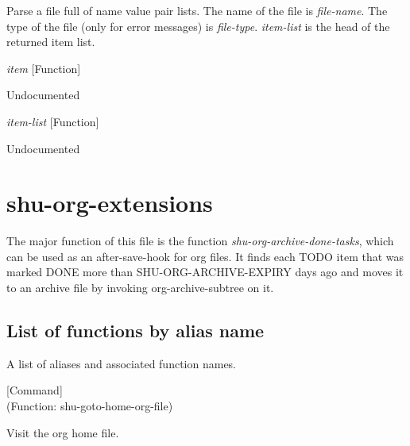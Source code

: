 \begin{doc-string}
Parse a file full of name value pair lists.  The name of the file is \emph{file-name}.
The type of the file (only for error messages) is \emph{file-type}.  \emph{item-list} is the head
of the returned item list.
\end{doc-string}

\vspace{1em}
\noindent
{}
\usebox{\funcname}\emph{item}
 \hfill [Function]

\begin{doc-string}
Undocumented
\end{doc-string}

\vspace{1em}
\noindent
{}
\usebox{\funcname}\emph{item-list}
 \hfill [Function]

\begin{doc-string}
Undocumented
\end{doc-string}

\eject
\section{shu-org-extensions}


The major function of this file is the function \emph{shu-org-archive-done-tasks},
which can be used as an after-save-hook for org files.  It finds each
TODO item that was marked DONE more than SHU-ORG-ARCHIVE-EXPIRY days
ago and moves it to an archive file by invoking org-archive-subtree
on it.


\subsection{List of functions by alias name}

A list of aliases and associated function names.



\vspace{1em}
\noindent
{}
\usebox{\funcname}
 \hfill [Command]\\%
 (Function: shu-goto-home-org-file)

\begin{doc-string}
Visit the org home file.
\end{doc-string}

